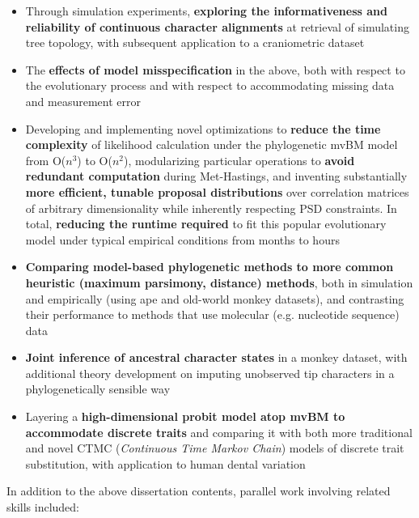 \documentclass[12pt]{article}
\begin{document}
\begin{itemize}[noitemsep]

\item Through simulation experiments, \textbf{exploring the informativeness and reliability of continuous character alignments} at retrieval of simulating tree topology, with subsequent application to a craniometric dataset 
\item The \textbf{effects of model misspecification} in the above, both with respect to the evolutionary process and with respect to accommodating missing data and measurement error
\item Developing and implementing novel optimizations to \textbf{reduce the time complexity} of likelihood calculation under the phylogenetic mvBM model from O($n^3$) to O($n^2$), modularizing particular operations to \textbf{avoid redundant computation} during Met-Hastings, and inventing substantially \textbf{more efficient, tunable proposal distributions} over correlation matrices of arbitrary dimensionality while inherently respecting PSD constraints. In total, \textbf{reducing the runtime required} to fit this popular evolutionary model under typical empirical conditions from months to hours
\item \textbf{Comparing model-based phylogenetic methods to more common heuristic (maximum parsimony, distance) methods}, both in simulation and empirically (using ape and old-world monkey datasets), and contrasting their performance to methods that use molecular (e.g. nucleotide sequence) data
\item \textbf{Joint inference of ancestral character states} in a monkey dataset, with additional theory development on imputing unobserved tip characters in a phylogenetically sensible way 
\item Layering a \textbf{high-dimensional probit model atop mvBM to accommodate discrete traits} and comparing it with both more traditional and novel CTMC (\emph{Continuous Time Markov Chain}) models of discrete trait substitution, with application to human dental variation

\end{itemize}

In addition to the above dissertation contents, parallel work involving related skills included:
\end{document}
